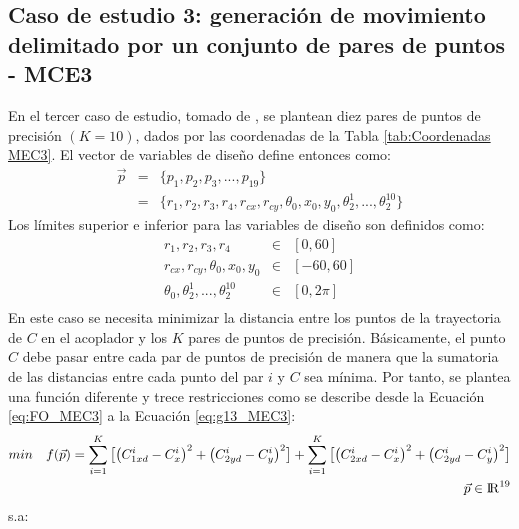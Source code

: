 \subsection{Caso de estudio 3: generación de movimiento delimitado por un conjunto de pares de puntos - MCE3}
En el tercer caso de estudio, tomado de \cite{Portilla_Mezura_MEC3}, se plantean diez pares de puntos de precisión $(K = 10)$, dados por las coordenadas de la Tabla \ref{tab:Coordenadas MEC3}. El vector de variables de diseño define entonces como:
\begin{eqnarray}\label{eq:Vector variables MEC1}
\vec{p} &=& \{p_1,p_2,p_3,...,p_{19} \}\\
       &=& \{ r_1,r_2,r_3,r_4,r_{cx},r_{cy},\theta_0,x_0,y_0,\theta^1_2,...,\theta^{10}_2 \} 
\end{eqnarray}
Los límites superior e inferior para las variables de diseño son definidos como:
\begin{eqnarray}\label{eq:limites variables MEC3}
r_1,r_2,r_3,r_4& \in & \left[ 0,60\right] \\
r_{cx},r_{cy},\theta_0,x_0,y_0 & \in & \left[ -60,60\right] \\
\theta_0,\theta^1_2,...,\theta^{10}_2& \in & \left[ 0,2\pi \right] \\
\end{eqnarray}
 En este caso se necesita minimizar la distancia entre los puntos de la trayectoria de $C$ en el acoplador y los $K$ pares de puntos de precisión. Básicamente, el punto $C$ debe pasar entre cada par de puntos de precisión de manera que la sumatoria de las distancias entre cada punto del par $i$ y $C$ sea mínima. Por tanto, se plantea una función diferente y trece restricciones como se describe desde la Ecuación \ref{eq:FO_MEC3} a la Ecuación \ref{eq:g13_MEC3}:
 \begin{equation}\label{eq:FO_MEC3}
 \begin{aligned}
min\quad  f(\vec{p})=
\sum_{i=1}^{K}\big[\big(C^{i}_{1xd}-C^{i}_{x} \big)^2 +\big(C^{i}_{2yd}-C^{i}_{y} \big)^2\big]+\sum_{i=1}^{K}\big[\big(C^{i}_{2xd}-C^{i}_{x} \big)^2 +\big(C^{i}_{2yd}-C^{i}_{y} \big)^2\big]
\\
\vec{p} \in  {\rm I\!R}^{19}
\end{aligned}
\end{equation}
s.a:

